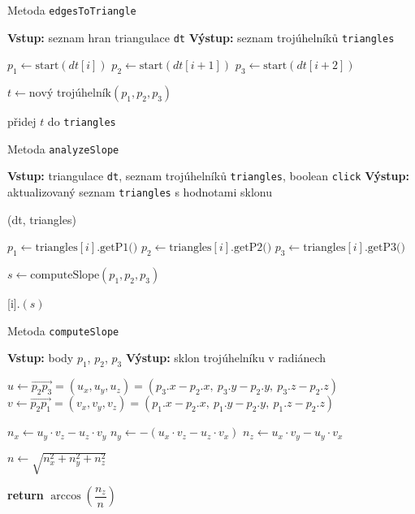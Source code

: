 \begin{algorithm}
    \caption{Metoda \texttt{edgesToTriangle}}
    \begin{algorithmic}[1]
        \STATE \textbf{Vstup:} seznam hran triangulace \texttt{dt}
        \STATE \textbf{Výstup:} seznam trojúhelníků \texttt{triangles}

            \STATE $p_1 \gets \text{start}(dt[i])$
            \STATE $p_2 \gets \text{start}(dt[i+1])$
            \STATE $p_3 \gets \text{start}(dt[i+2])$

            \STATE $t \gets \text{nový trojúhelník}(p_1, p_2, p_3)$

            \STATE přidej $t$ do \texttt{triangles}
        \ENDFOR
    \end{algorithmic}
\end{algorithm}

\begin{algorithm}
    \caption{Metoda \texttt{analyzeSlope}}
    \begin{algorithmic}[1]
        \STATE \textbf{Vstup:} triangulace \texttt{dt}, seznam trojúhelníků \texttt{triangles}, boolean \texttt{click}
        \STATE \textbf{Výstup:} aktualizovaný seznam \texttt{triangles} s hodnotami sklonu

            \STATE {}(dt, triangles)
        \ENDIF

            \STATE $p_1 \gets \text{triangles}[i].\text{getP1()}$
            \STATE $p_2 \gets \text{triangles}[i].\text{getP2()}$
            \STATE $p_3 \gets \text{triangles}[i].\text{getP3()}$

            \STATE $s \gets \text{computeSlope}(p_1, p_2, p_3)$

            \STATE {}[i].$(s)$
        \ENDFOR
    \end{algorithmic}
\end{algorithm}

\begin{algorithm}
    \caption{Metoda \texttt{computeSlope}}
    \begin{algorithmic}[1]
        \STATE \textbf{Vstup:} body $p_1$, $p_2$, $p_3$
        \STATE \textbf{Výstup:} sklon trojúhelníku v radiánech

        \STATE $u \gets \vec{p_2p_3} = (u_x, u_y, u_z) = (p_3.x - p_2.x,\ p_3.y - p_2.y,\ p_3.z - p_2.z)$
        \STATE $v \gets \vec{p_2p_1} = (v_x, v_y, v_z) = (p_1.x - p_2.x,\ p_1.y - p_2.y,\ p_1.z - p_2.z)$

        \STATE $n_x \gets u_y \cdot v_z - u_z \cdot v_y$
        \STATE $n_y \gets -(u_x \cdot v_z - u_z \cdot v_x)$
        \STATE $n_z \gets u_x \cdot v_y - u_y \cdot v_x$

        \STATE $n \gets \sqrt{n_x^2 + n_y^2 + n_z^2}$ 

        \STATE \textbf{return} $\arccos \left(\dfrac{n_z}{n}\right)$
    \end{algorithmic}
\end{algorithm}
